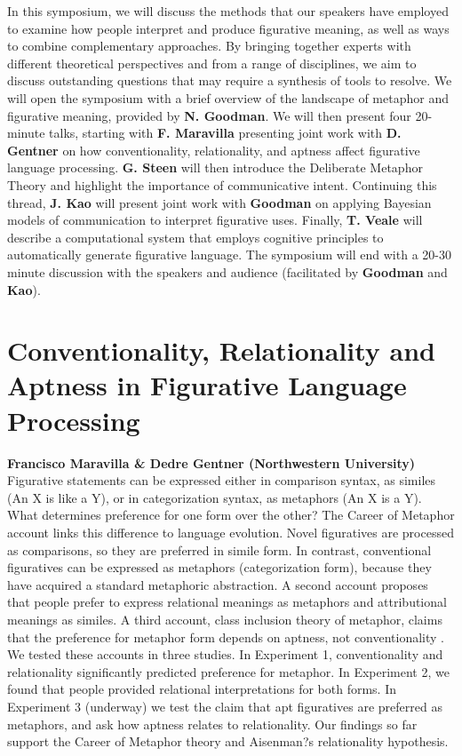 \documentclass[10pt,letterpaper]{article}
\begin{document}
In this symposium, we will discuss the methods that our speakers have employed to examine how people interpret and produce figurative meaning, as well as ways to combine complementary approaches. By bringing together experts with different theoretical perspectives and from a range of disciplines, we aim to discuss outstanding questions that may require a synthesis of tools to resolve. We will open the symposium with a brief overview of the landscape of metaphor and figurative meaning, provided by \textbf{N. Goodman}. We will then present four 20-minute talks, starting with \textbf{F. Maravilla} presenting joint work with \textbf{D. Gentner} on how conventionality, relationality, and aptness affect figurative language processing. \textbf{G. Steen} will then introduce the Deliberate Metaphor Theory and highlight the importance of communicative intent. Continuing this thread, \textbf{J. Kao} will present joint work with \textbf{Goodman} on applying Bayesian models of communication to interpret figurative uses. Finally, \textbf{T. Veale} will describe a computational system that employs cognitive principles to automatically generate figurative language.
The symposium will end with a 20-30 minute discussion with the speakers and audience (facilitated by \textbf{Goodman} and \textbf{Kao}).	


\section{Conventionality, Relationality and Aptness in Figurative Language Processing}
\large \textbf{Francisco Maravilla \& Dedre Gentner (Northwestern University)}\\
Figurative statements can be expressed either in comparison syntax, as similes (An X is like a Y), or in categorization syntax, as metaphors (An X is a Y).  What determines preference for one form over the other? The Career of Metaphor account \cite{bowdle2005career, gentner1997alignment} links this difference to language evolution. Novel figuratives are processed as comparisons, so they are preferred in simile form. In contrast, conventional figuratives can be expressed as metaphors (categorization form), because they have acquired a standard metaphoric abstraction. A second account \cite{aisenman1999structure} proposes that people prefer to express relational meanings as metaphors and attributional meanings as similes. A third account,  class inclusion theory of metaphor, claims that the preference for metaphor form depends on aptness, not conventionality \cite{glucksberg2003psycholinguistics}. We tested these accounts in three studies. In Experiment 1, conventionality and relationality significantly predicted preference for metaphor. In Experiment 2, we found that people provided relational interpretations for both forms. In Experiment 3 (underway) we test the claim that apt figuratives are preferred as metaphors, and ask how aptness relates to relationality. Our findings so far support the Career of Metaphor theory and Aisenman?s relationality hypothesis.
\end{document}
